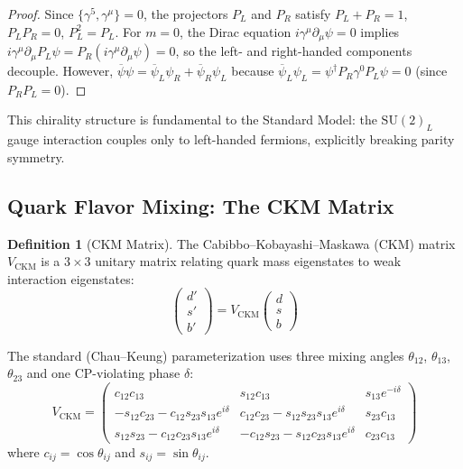 \documentclass[12pt]{article}
\theoremstyle{definition}
\newtheorem{definition}[theorem]{Definition}
\theoremstyle{remark}
\newcommand{\psibar}{\overline{\psi}}
\begin{document}
\begin{proof}
Since $\{\gamma^5, \gamma^\mu\} = 0$, the projectors $P_L$ and $P_R$ satisfy $P_L + P_R = 1$, $P_L P_R = 0$, $P_L^2 = P_L$. For $m = 0$, the Dirac equation $i\gamma^\mu \partial_\mu \psi = 0$ implies $i\gamma^\mu \partial_\mu P_L \psi = P_R (i\gamma^\mu \partial_\mu \psi) = 0$, so the left- and right-handed components decouple. However, $\psibar \psi = \psibar_L \psi_R + \psibar_R \psi_L$ because $\psibar_L \psi_L = \psi^\dagger P_R \gamma^0 P_L \psi = 0$ (since $P_R P_L = 0$).
\end{proof}

This chirality structure is fundamental to the Standard Model: the $\mathrm{SU}(2)_L$ gauge interaction couples only to left-handed fermions, explicitly breaking parity symmetry.

\subsection{Quark Flavor Mixing: The CKM Matrix}

\begin{definition}[CKM Matrix]
\label{def:ckm}
The Cabibbo--Kobayashi--Maskawa (CKM) matrix $V_{\mathrm{CKM}}$ is a $3 \times 3$ unitary matrix relating quark mass eigenstates to weak interaction eigenstates:
\begin{equation}
\begin{pmatrix} d' \\ s' \\ b' \end{pmatrix} = V_{\mathrm{CKM}} \begin{pmatrix} d \\ s \\ b \end{pmatrix}
\end{equation}
\end{definition}

The standard (Chau--Keung) parameterization uses three mixing angles $\theta_{12}$, $\theta_{13}$, $\theta_{23}$ and one CP-violating phase $\delta$:
\begin{equation}
\label{eq:ckmstandard}
V_{\mathrm{CKM}} = \begin{pmatrix}
c_{12}c_{13} & s_{12}c_{13} & s_{13}e^{-i\delta} \\
-s_{12}c_{23} - c_{12}s_{23}s_{13}e^{i\delta} & c_{12}c_{23} - s_{12}s_{23}s_{13}e^{i\delta} & s_{23}c_{13} \\
s_{12}s_{23} - c_{12}c_{23}s_{13}e^{i\delta} & -c_{12}s_{23} - s_{12}c_{23}s_{13}e^{i\delta} & c_{23}c_{13}
\end{pmatrix}
\end{equation}
where $c_{ij} = \cos\theta_{ij}$ and $s_{ij} = \sin\theta_{ij}$.
\end{document}
